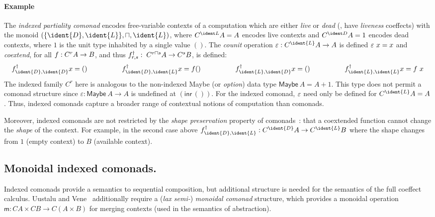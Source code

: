 \paragraph{Example}
The \emph{indexed partiality comonad} encodes free-variable contexts
of a computation which are either \emph{live} or \emph{dead} (\ie{}, have
\emph{liveness} coeffects) with the monoid $(\{\ident{D}, \ident{L}\},
\sqcap, \ident{L})$, where $\iftor{\ident L} A = A$ encodes live
contexts and $\iftor{\ident D} A = 1$ encodes dead contexts,
where $1$ is the unit type inhabited by a single value $()$.
The \emph{counit} operation $\counit{} : \iftor{\ident{L}} A \rightarrow A$
is defined $\varepsilon\ x = x$ and \emph{coextend},
for all $f : C^{r} A \rightarrow B$, and thus
$f^\dagger_{r, s} : \; C^{r \sqcap s} A \rightarrow C^{s} B$,
is defined:
%
\begin{align*}
\begin{array}{llll}
\cobind{f}{\ident{D}, \ident{D}} x = () \qquad\qquad & 
\cobind{f}{\ident{D}, \ident{L}} x = f () \qquad\qquad &
\cobind{f}{\ident{L}, \ident{D}} x = () \qquad\qquad &
\cobind{f}{\ident{L}, \ident{L}} x = f~x 
\end{array}
\end{align*}
%
The indexed family $C^r$ here is analogous to the non-indexed \textsf{Maybe} (or \emph{option})
data type $\mathsf{Maybe}\ A = A + 1$.  This
type does not permit a comonad structure since
$\varepsilon : \mathsf{Maybe}\ A \rightarrow A$ is undefined at $(\textsf{inr} \, ())$. 
For the indexed comonad, $\varepsilon$ need only be defined
 for $\iftor{\ident{L}} A = A$. Thus, indexed comonads capture a broader range of
 contextual notions of computation than comonads.

 Moreover, indexed comonads are not restricted by the \emph{shape
   preservation} property of comonads~\cite{orchard12codo}: that
 a coextended function cannot change the \emph{shape} of the
 context. For example, in the second case above $f^\dagger_{\ident{D},
   \ident{L}} : \iftor{\ident{D}} A \rightarrow \iftor{\ident{L}} B$
 where the shape changes from $1$ (empty context) to $B$ (available
 context). 

\vspace{-1em}
\subsection{Monoidal indexed comonads.}
Indexed comonads provide a semantics to sequential composition, but
additional structure is needed for the semantics of the full coeffect calculus.
Uustalu and Vene~\cite{comonads-notions} additionally require a (\emph{lax semi-}) \emph{monoidal comonad} 
structure, which provides a monoidal operation $\mathsf{m} : C A
\times C B \rightarrow C (A \times B)$ for merging contexts (used in
the semantics of abstraction).

